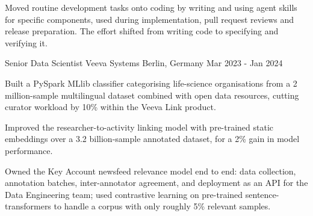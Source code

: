\begin{cventries}
{\begin{cvitems}
%
%
		\item {Moved routine development tasks onto coding by writing and using agent skills for specific components, used during implementation, pull request reviews and release preparation. The effort shifted from writing code to specifying and verifying it.}
      \end{cvitems}
    }
	



  \cventry
    {Senior Data Scientist} %
    {Veeva Systems} %
    {Berlin, Germany} %
    {Mar 2023 - Jan 2024} %
	{
      \begin{cvitems} %
		\item {Built a PySpark MLlib classifier categorising life-science organisations from a 2 million-sample multilingual dataset combined with open data resources, cutting curator workload by 10\% within the Veeva Link product.}
		\item {Improved the researcher-to-activity linking model with pre-trained static embeddings over a 3.2 billion-sample annotated dataset, for a 2\% gain in model performance.}
		\item {Owned the Key Account newsfeed relevance model end to end: data collection, annotation batches, inter-annotator agreement, and deployment as an API for the Data Engineering team; used contrastive learning on pre-trained sentence-transformers to handle a corpus with only roughly 5\% relevant samples.}
      \end{cvitems}
    }
	
	

\end{cventries}
